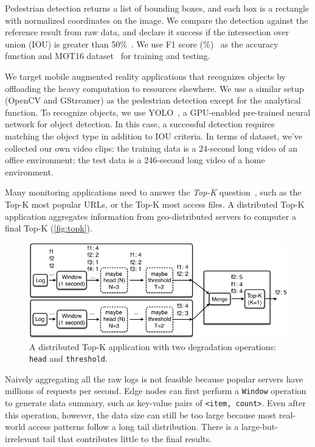 Pedestrian detection returns a list of bounding boxes, and each box is a
rectangle with normalized coordinates on the image. We compare the detection
against the reference result from raw data, and declare it success if the
intersection over union (IOU) is greater than
50\%~\cite{everingham2010pascal}. We use F1 score
(\%)~\cite{Rijsbergen:1979:IR:539927} as the accuracy function and MOT16
dataset~\cite{milan2016mot16} for training and testing.

 We target mobile augmented reality applications
that recognizes objects by offloading the heavy computation to resources
elsewhere.
We use a similar setup (OpenCV and GStreamer) as the pedestrian detection except
for the analytical function. To recognize objects, we use YOLO~\cite{darknet13,
  redmon2016yolo9000}, a GPU-enabled pre-trained neural network for object detection. In
this case, a successful detection requires matching the object type in addition
to IOU criteria. In terms of dataset, we've collected our own video clips: the training data is a 24-second long video of an office environment; the test data is a 246-second long video of a home environment.

 Many monitoring applications need to answer the
\textit{Top-K} question~\cite{babcock2003distributed}, such as the Top-K most
popular URLs, or the Top-K most access files. A distributed Top-K application
aggregates information from geo-distributed servers to computer a final Top-K (\autoref{fig:topk}).

\begin{figure}
  \centering
  \includegraphics[width=\columnwidth]{figures/topk.pdf}
  \caption{A distributed Top-K application with two degradation operations:
    \texttt{head} and \texttt{threshold}.}
  \label{fig:topk}
\end{figure}

Naively aggregating all the raw logs is not feasible because popular servers
have millions of requests per second. Edge nodes can first perform a
\texttt{Window} operation to generate data summary, such as key-value pairs of
\texttt{<item, count>}. Even after this operation, however, the data size can
still be too large because most real-world access patterns follow a long tail
distribution. There is a large-but-irrelevant tail that contributes little to
the final results.

